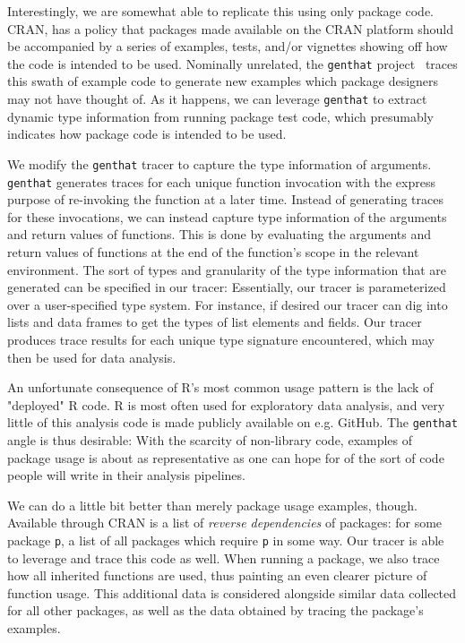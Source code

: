 \documentclass[acmsmall,10pt,review,anonymous]{acmart}\settopmatter{printfolios=true,printccs=false,printacmref=false}
\begin{document}
Interestingly, we are somewhat able to replicate this using only package
code.  CRAN, has a policy that packages made available on the
CRAN platform should be accompanied by a series of examples, tests, and/or
vignettes showing off how the code is intended to be used.  Nominally
unrelated, the {\tt genthat} project~\cite{kvrikava2018tests} traces this swath of example
code to generate new examples which package designers may not have thought
of.  As it happens, we can leverage {\tt genthat} to extract dynamic type
information from running package test code, which presumably indicates
how package code is intended to be used.


We modify the {\tt genthat} tracer to capture the type information of arguments.
{\tt genthat} generates traces for each unique function invocation with the express purpose of re-invoking the function at a later time.
Instead of generating traces for these invocations, we can instead capture type information of the arguments and return values of functions.
This is done by evaluating the arguments and return values of functions at the end of the function's scope in the relevant environment.
The sort of types and granularity of the type information that are generated can be specified in our tracer:
Essentially, our tracer is parameterized over a user-specified type system.
For instance, if desired our tracer can dig into lists and data frames to get the types of list elements and fields.
Our tracer produces trace results for each unique type signature encountered, which may then be used for data analysis.

An unfortunate consequence of R's most common usage pattern is the lack of "deployed" R code.
R is most often used for exploratory data analysis, and very little of this analysis code is made publicly available on e.g. GitHub.
The {\tt genthat} angle is thus desirable:
With the scarcity of non-library code, examples of package usage is about as representative as one can hope for of the sort of code people will write in their analysis pipelines.

We can do a little bit better than merely package usage examples, though.
Available through CRAN is a list of {\it reverse dependencies} of packages:
for some package {\tt p}, a list of all packages which require {\tt p} in some way.
Our tracer is able to leverage and trace this code as well.
When running a package, we also trace how all inherited functions are used, thus painting an even clearer picture of function usage.
This additional data is considered alongside similar data collected for all other packages, as well as the data obtained by tracing the package's examples.
\end{document}

